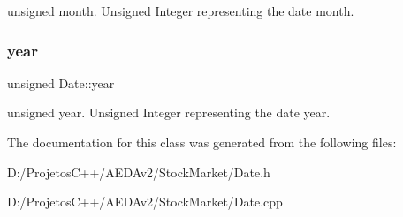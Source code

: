 unsigned month. Unsigned Integer representing the date month. \mbox{\label{class_date_a68742ab0fdabd6dbadb5c0fdb7888f55}} 
\subsubsection{\texorpdfstring{year}{year}}
{\footnotesize\ttfamily unsigned Date\+::year\hspace{0.3cm}{\ttfamily [private]}}

unsigned year. Unsigned Integer representing the date year. 

The documentation for this class was generated from the following files\+:\begin{DoxyCompactItemize}
\item 
D\+:/\+Projetos\+C++/\+A\+E\+D\+Av2/\+Stock\+Market/Date.\+h\item 
D\+:/\+Projetos\+C++/\+A\+E\+D\+Av2/\+Stock\+Market/Date.\+cpp\end{DoxyCompactItemize}
